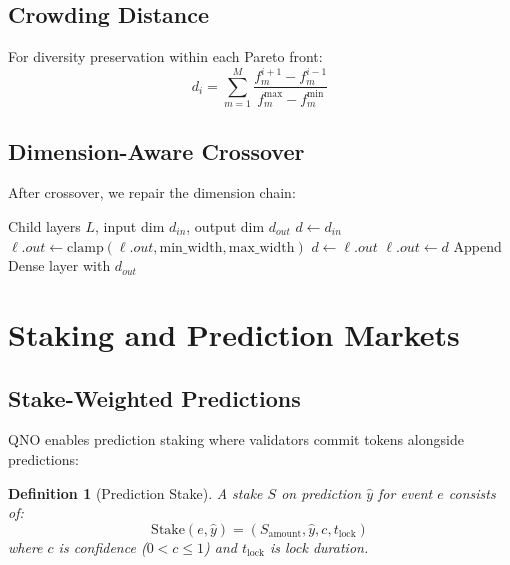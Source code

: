 \documentclass[11pt,a4paper]{article}
\newtheorem{definition}[theorem]{Definition}
\begin{document}
\subsection{Crowding Distance}

For diversity preservation within each Pareto front:
\begin{equation}
d_i = \sum_{m=1}^{M} \frac{f_m^{i+1} - f_m^{i-1}}{f_m^{\max} - f_m^{\min}}
\end{equation}

\subsection{Dimension-Aware Crossover}

After crossover, we repair the dimension chain:

\begin{algorithm}
\caption{Dimension Repair After Crossover}
\begin{algorithmic}[1]
\Require Child layers $L$, input dim $d_{in}$, output dim $d_{out}$
\State $d \gets d_{in}$
        \State $\ell.out \gets \text{clamp}(\ell.out, \text{min\_width}, \text{max\_width})$
        \State $d \gets \ell.out$
    \Else
        \State $\ell.out \gets d$ 
    \EndIf
\EndFor
{}
    \State Append Dense layer with $d_{out}$
\EndIf
\end{algorithmic}
\end{algorithm}

\section{Staking and Prediction Markets}

\subsection{Stake-Weighted Predictions}

QNO enables prediction staking where validators commit tokens alongside predictions:

\begin{definition}[Prediction Stake]
A stake $S$ on prediction $\hat{y}$ for event $e$ consists of:
\begin{equation}
\text{Stake}(e, \hat{y}) = (S_{\text{amount}}, \hat{y}, c, t_{\text{lock}})
\end{equation}
where $c$ is confidence ($0 < c \leq 1$) and $t_{\text{lock}}$ is lock duration.
\end{definition}
\end{document}
